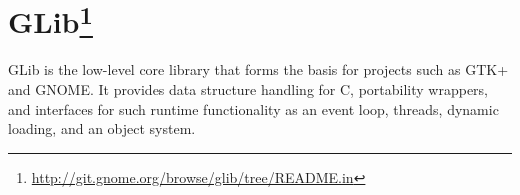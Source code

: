 
\section[GLib]{GLib\footnote{\url{http://git.gnome.org/browse/glib/tree/README.in}}}\label{GLib}

GLib is the low-level core library that forms the basis for projects such as GTK+ and GNOME. It provides data structure handling for C, portability wrappers, and interfaces for such runtime functionality as an event loop, threads, dynamic loading, and an object system.
